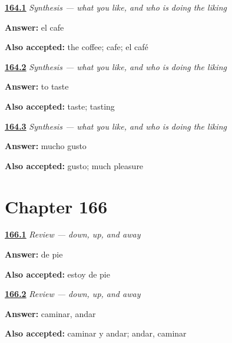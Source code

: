 \noindent\begin{minipage}[t]{\linewidth}
\raggedright
\hyperlink{review-ES-C35-sintesis-gustar-subject}{\textbf{164.1}} \emph{Synthesis — what you like, and who is doing the liking}\par
\small \textbf{Answer:} el cafe\par
\footnotesize \textbf{Also accepted:} the coffee; cafe; el café
\end{minipage}\par\medskip

\noindent\begin{minipage}[t]{\linewidth}
\raggedright
\hyperlink{review-ES-C35-sintesis-gustar-taste}{\textbf{164.2}} \emph{Synthesis — what you like, and who is doing the liking}\par
\small \textbf{Answer:} to taste\par
\footnotesize \textbf{Also accepted:} taste; tasting
\end{minipage}\par\medskip

\noindent\begin{minipage}[t]{\linewidth}
\raggedright
\hyperlink{review-ES-C35-sintesis-gustar-joke}{\textbf{164.3}} \emph{Synthesis — what you like, and who is doing the liking}\par
\small \textbf{Answer:} mucho gusto\par
\footnotesize \textbf{Also accepted:} gusto; much pleasure
\end{minipage}\par\medskip

\section*{Chapter 166}

\noindent\begin{minipage}[t]{\linewidth}
\raggedright
\hyperlink{review-ES-C37-repaso-sentado-de-pie-andando-depie}{\textbf{166.1}} \emph{Review — down, up, and away}\par
\small \textbf{Answer:} de pie\par
\footnotesize \textbf{Also accepted:} estoy de pie
\end{minipage}\par\medskip

\noindent\begin{minipage}[t]{\linewidth}
\raggedright
\hyperlink{review-ES-C37-repaso-sentado-de-pie-andando-andar}{\textbf{166.2}} \emph{Review — down, up, and away}\par
\small \textbf{Answer:} caminar, andar\par
\footnotesize \textbf{Also accepted:} caminar y andar; andar, caminar
\end{minipage}\par\medskip

